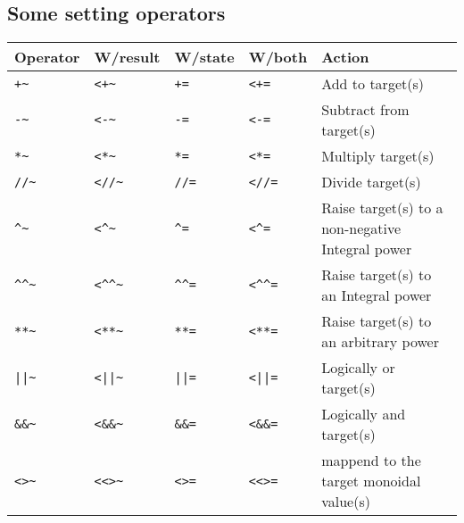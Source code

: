 \begin{box2}
\subsection *{Some setting operators}
\begin{tabular}{ l l l l l }
\textbf{Operator}  &  \textbf{W/result}  &  \textbf{W/state}  &  \textbf{W/both}  &  \textbf{Action}\\
\hline
\verb!+~ !         &  \verb!<+~ !        &  \verb!+= !        &  \verb!<+= !      &  Add to target(s)\\
\verb!-~ !         &  \verb!<-~ !        &  \verb!-= !        &  \verb!<-= !      &  Subtract from target(s)\\
\verb!*~ !         &  \verb!<*~ !        &  \verb!*= !        &  \verb!<*= !      &  Multiply target(s)\\
\verb!//~!         &  \verb!<//~!        &  \verb!//=!        &  \verb!<//=!      &  Divide target(s)\\
\verb!^~ !         &  \verb!<^~ !        &  \verb!^= !        &  \verb!<^= !      &  Raise target(s) to a non-negative Integral power\\
\verb!^^~!         &  \verb!<^^~!        &  \verb!^^=!        &  \verb!<^^=!      &  Raise target(s) to an Integral power\\
\verb!**~!         &  \verb!<**~!        &  \verb!**=!        &  \verb!<**=!      &  Raise target(s) to an arbitrary power\\
\verb!||~!         &  \verb!<||~!        &  \verb!||=!        &  \verb!<||=!      &  Logically or target(s)\\
\verb!&&~!         &  \verb!<&&~!        &  \verb!&&=!        &  \verb!<&&=!      &  Logically and target(s)\\
\verb!<>~!         &  \verb!<<>~!        &  \verb!<>=!        &  \verb!<<>=!      &  mappend to the target monoidal value(s)\\
\end{tabular}
\end{box2}



